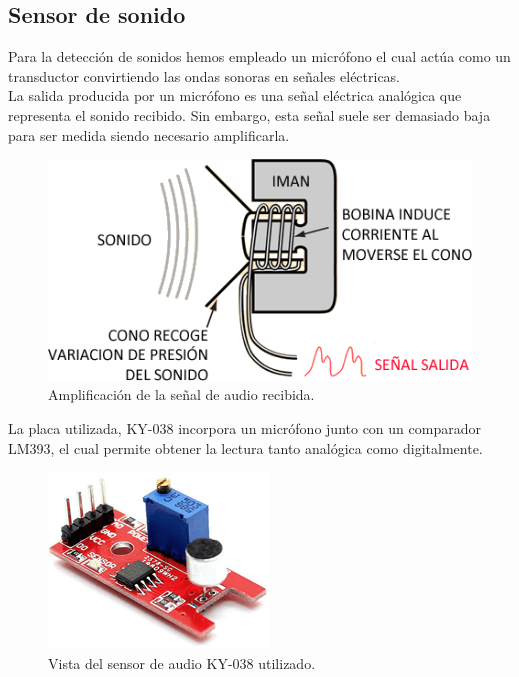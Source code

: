 \subsection{ Sensor de sonido }

Para la detección de sonidos hemos empleado un micrófono el cual actúa como un transductor convirtiendo las ondas sonoras en señales eléctricas.\\

La salida producida por un micrófono es una señal eléctrica analógica que representa el sonido recibido. Sin embargo, esta señal suele ser demasiado baja para ser medida
siendo necesario amplificarla.\\

\begin{figure}[H]
  \begin{center}
    \includegraphics[scale=0.4]{imagenes/micro_amplificador.png}
  \end{center}
  \caption{Amplificación de la señal de audio recibida.}
  \label{figura:micro_amplificacion}
\end{figure}

La placa utilizada, KY-038 incorpora un micrófono junto con un comparador LM393, el cual permite obtener la lectura tanto analógica como digitalmente.\\

\begin{figure}[H]
  \begin{center}
    \includegraphics[scale=0.4]{imagenes/micro.png}
  \end{center}
  \caption{Vista del sensor de audio KY-038 utilizado.}
  \label{figura:micro_amplificacion}
\end{figure}

